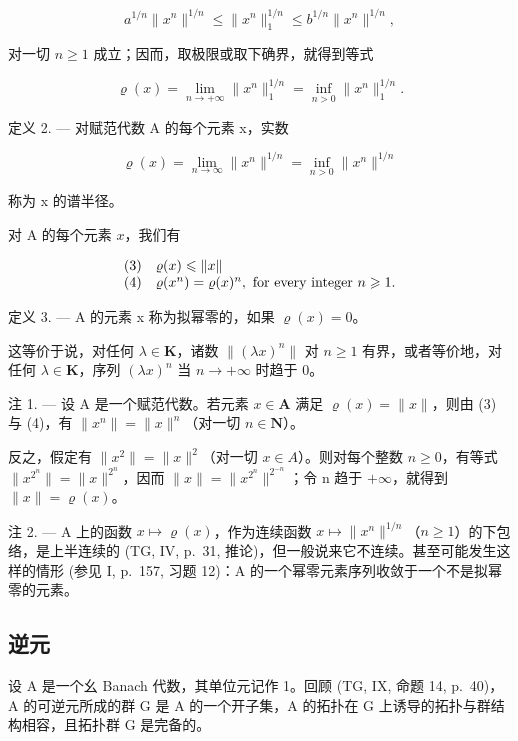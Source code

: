 \[
a ^ {1 / n} \| x ^ {n} \| ^ {1 / n} \leqslant \| x ^ {n} \| _ {1} ^ {1 / n} \leqslant b ^ {1 / n} \| x ^ {n} \| ^ {1 / n},
\]

对一切 \(n \geqslant 1\) 成立；因而，取极限或取下确界，就得到等式

\[
\varrho (x) = \lim _ {n \to + \infty} \| x ^ {n} \| _ {1} ^ {1 / n} = \inf _ {n > 0} \| x ^ {n} \| _ {1} ^ {1 / n}.
\]

定义 2. --- 对赋范代数 A 的每个元素 x，实数

\[
\varrho (x) = \lim _ {n \to \infty} \| x ^ {n} \| ^ {1 / n} = \inf _ {n > 0} \| x ^ {n} \| ^ {1 / n}
\]

称为 x 的谱半径。

对 A 的每个元素 \(x\)，我们有

\[
\begin{array}{r l} (3) & \varrho (x) \leqslant \| x \| \\ (4) & \varrho (x ^ {n}) = \varrho (x) ^ {n}, \text { for every integer } n \geqslant 1. \end{array}
\]

定义 3. --- A 的元素 x 称为拟幂零的，如果 \(\varrho(x)=0\)。

这等价于说，对任何 \(\lambda \in \mathbf{K}\)，诸数 \(\| (\lambda x)^n\|\) 对 \(n\geqslant 1\) 有界，或者等价地，对任何 \(\lambda \in \mathbf{K}\)，序列 \((\lambda x)^n\) 当 \(n\to +\infty\) 时趋于 0。

注 1. --- 设 A 是一个赋范代数。若元素 \(x \in \mathbf{A}\) 满足 \(\varrho(x) = \|x\|\)，则由 (3) 与 (4)，有 \(\|x^n\| = \|x\|^n\)（对一切 \(n \in \mathbf{N}\)）。

反之，假定有 \(\|x^{2}\|=\|x\|^{2}\)（对一切 \(x\in A\)）。则对每个整数 \(n\geqslant0\)，有等式 \(\|x^{2^{n}}\|=\|x\|^{2^{n}}\)，因而 \(\|x\|=\|x^{2^{n}}\|^{2^{-n}}\)；令 n 趋于 \(+\infty\)，就得到 \(\|x\|=\varrho(x)\)。

注 2. --- A 上的函数 \(x \mapsto \varrho(x)\)，作为连续函数 \(x \mapsto \|x^n\|^{1/n}\)（\(n \geqslant 1\)）的下包络，是上半连续的 (TG, IV, p.~31, 推论)，但一般说来它不连续。甚至可能发生这样的情形 (参见 I, p.~157, 习题 12)：A 的一个幂零元素序列收敛于一个不是拟幂零的元素。

\subsection{逆元}

设 A 是一个幺 Banach 代数，其单位元记作 1。回顾 (TG, IX, 命题 14, p.~40)，A 的可逆元所成的群 G 是 A 的一个开子集，A 的拓扑在 G 上诱导的拓扑与群结构相容，且拓扑群 G 是完备的。

